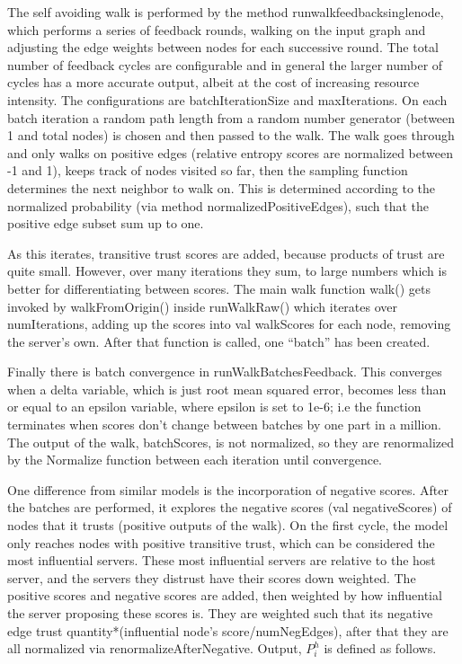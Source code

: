 \documentclass{article}
\theoremstyle{definition}
\theoremstyle{remark}
\theoremstyle{plain}
\begin{document}
The self avoiding walk is performed by the method runwalkfeedbacksinglenode, which performs a series of feedback rounds, walking on the input graph and adjusting the edge weights between nodes for each successive round. The total number of feedback cycles are configurable and in general the larger number of cycles has a more accurate output, albeit at the cost of increasing resource intensity. The configurations are batchIterationSize and maxIterations. On each batch iteration a random path length from a random number generator (between 1 and total nodes) is chosen and then passed to the walk. The walk goes through and only walks on positive edges (relative entropy scores are normalized between -1 and 1), keeps track of nodes visited so far, then the sampling function determines the next neighbor to walk on. This is determined according to the normalized probability (via method normalizedPositiveEdges), such that the positive edge subset sum up to one.

As this iterates, transitive trust scores are added, because products of trust are quite small. However, over many iterations they sum, to large numbers which is better for differentiating between scores. The main walk function walk() gets invoked by walkFromOrigin() inside runWalkRaw() which iterates over numIterations, adding up the scores into val walkScores for each node, removing the server’s own. After that function is called, one “batch” has been created. 

Finally there is batch convergence in runWalkBatchesFeedback. This converges when a delta variable, which is just root mean squared error, becomes less than or equal to an epsilon variable, where epsilon is set to 1e-6; i.e the function terminates when scores don’t change between batches by one part in a million. The output of the walk, batchScores, is not normalized, so they are renormalized by the Normalize function between each iteration until convergence.

One difference from similar models is the incorporation of negative scores. After the batches are performed, it explores the negative scores (val negativeScores) of nodes that it trusts (positive outputs of the walk). On the first cycle, the model only reaches nodes with positive transitive trust, which can be considered the most influential servers. These most influential servers are relative to the host server, and the servers they distrust have their scores down weighted. The positive scores and negative scores are added, then weighted by how influential the server proposing these scores is. They are weighted such that its negative edge trust quantity*(influential node’s score/numNegEdges), after that they are all normalized via renormalizeAfterNegative. Output, $P_i^h$ is defined as follows.
\end{document}
